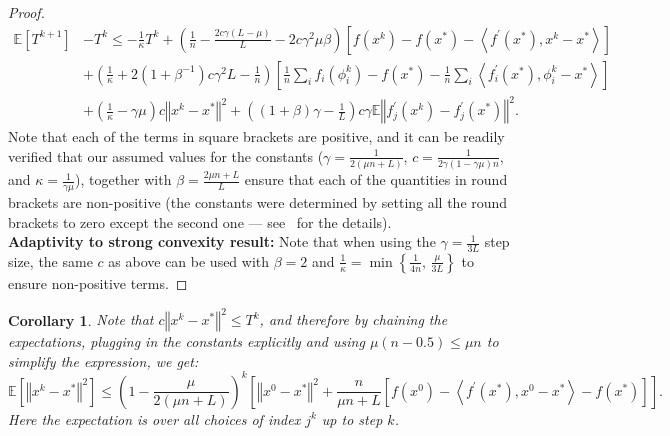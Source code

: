 \documentclass{article}
\newtheorem{cor}{Corollary}
\newcommand{\stepsize}{\gamma} %
\begin{document}
\begin{proof}
\begingroup\makeatletter{}\check@mathfonts
\begin{align}
\mathbb{E}[T^{k+1}]&-T^{k} \leq -\frac{1}{\kappa}T^{k} + \left(\frac{1}{n}-\frac{2c\stepsize(L-\mu)}{L} -2c\stepsize^2\mu\beta \right)\left[f(x^k)-f(x^{*})-\left\langle f^{\prime}(x^{*}),x^k-x^{*}\right\rangle \right]\nonumber \\
 &   +\left(\frac{1}{\kappa}+2(1+\beta^{-1})c\stepsize^{2}L-\frac{1}{n}\right)\left[\frac{1}{n}\sum_{i}f_{i}(\phi_{i}^{k})-f(x^{*})-\frac{1}{n}\sum_{i}\left\langle f_{i}^{\prime}(x^{*}),\phi_{i}^{k}-x^{*}\right\rangle \right]\nonumber \\
 &   +\left(\frac{1}{\kappa}-\stepsize\mu\right)c\left\Vert x^k-x^{*}\right\Vert ^{2}+\left((1+\beta)\stepsize-\frac{1}{ L}\right) c\stepsize \mathbb{E}\left\Vert f_{j}^{\prime}(x^k)-f_{j}^{\prime}(x^{*})\right\Vert ^{2} . \label{eq:constants-strong}
\end{align}
\endgroup
Note that each of the terms in square brackets are positive, and it
can be readily verified that our assumed values for the constants
($\stepsize=\frac{1}{2(\mu n+L)}$, $c=\frac{1}{2\stepsize(1-\stepsize\mu)n}$, and $\kappa=\frac{1}{\stepsize\mu}$), together with $\beta=\frac{2\mu n+L}{L}$ ensure
that each of the quantities in round brackets are non-positive (the constants were determined by setting all the round brackets to zero except the second one  --- see~\citep{adefazio-thesis2014} for the details). \\
\textbf{Adaptivity to strong convexity result:} Note that when using the $\stepsize=\frac{1}{3L}$ step size, the same $c$ as above can be used with $\beta=2$ and $\frac{1}{\kappa}=\min\left\{ \frac{1}{4n},\,\frac{\mu}{3L}\right\}$ to ensure non-positive terms.
\end{proof}
\begin{cor}
Note that $c\left\Vert x^{k}-x^{*}\right\Vert ^{2}\leq T^{k}$, and therefore
by chaining the expectations, plugging in the constants explicitly and using $\mu (n-0.5) \leq \mu n$ to simplify the expression, we get:
\begingroup\makeatletter\def\f@size{9}\check@mathfonts
\[
\mathbb{E}\left[\left\Vert x^{k}-x^{*}\right\Vert ^{2}\right]\leq\left(1-\frac{\mu}{2(\mu n+L)}\right)^{k}\left[\left\Vert x^{0}-x^{*}\right\Vert ^{2} 
+ \frac{n}{\mu n + L}
\left[f(x^{0}) -\left\langle f^{\prime}(x^{*}),x^{0}-x^{*}\right\rangle  -f(x^{*})\right]\right].
\]
\endgroup
Here the expectation is over all choices of index $j^{k}$ up to step $k$. 
\end{cor}
\end{document}
